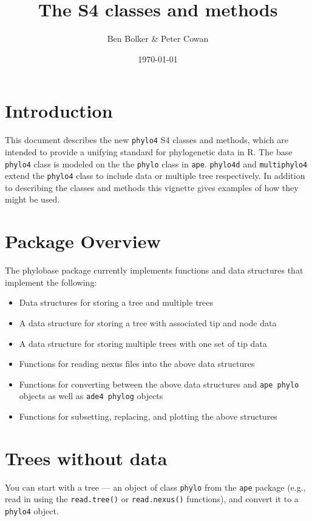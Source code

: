 \documentclass{article}
\title{The \code{phylo4} S4 classes and methods}
\author{Ben Bolker \& Peter Cowan}
\date{\today}
\newcommand{\code}[1]{{{\tt #1}}}
\begin{document}
\maketitle
\tableofcontents

\section{Introduction}

This document describes the new \code{phylo4} S4 classes and methods, which are intended to provide a unifying standard for phylogenetic data in R.  The base \code{phylo4} class is modeled on the the \code{phylo} class in \code{ape}.  \code{phylo4d} and \code{multiphylo4} extend the \code{phylo4} class to include data or multiple tree respectively.  In addition to describing the classes and methods this vignette gives examples of how they might be used.

\section{Package Overview}

The phylobase package currently implements functions and data structures that implement the following:

\begin{itemize}
  \item Data structures for storing a tree and multiple trees
  \item A data structure for storing a tree with associated tip and node data
  \item A data structure for storing multiple trees with one set of tip data
  \item Functions for reading nexus files into the above data structures
  \item Functions for converting between the above data structures and \code{ape phylo} objects as well as \code{ade4 phylog} objects
  \item Functions for subsetting, replacing, and plotting the above structures
\end{itemize}

\section{Trees without data}

You can start with a tree --- an object of
class \code{phylo} from the \code{ape} package
(e.g., read in using the \code{read.tree()} or \code{read.nexus()}
functions), and convert it to a \code{phylo4} object.
\end{document}
